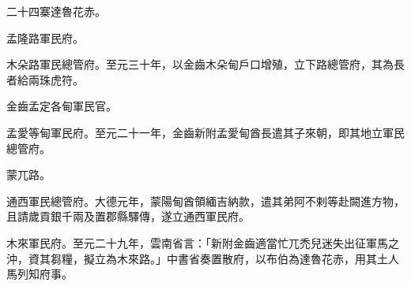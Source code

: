 \begin{pinyinscope}
 二十四寨達魯花赤。



 孟隆路軍民府。



 木朵路軍民總管府。至元三十年，以金齒木朵甸戶口增殖，立下路總管府，其為長者給兩珠虎符。



 金齒孟定各甸軍民官。



 孟愛等甸軍民府。至元二十一年，金齒新附孟愛甸酋長遣其子來朝，即其地立軍民總管府。



 蒙兀路。



 通西軍民總管府。大德元年，蒙陽甸酋領緬吉納款，遣其弟阿不剌等赴闕進方物，且請歲貢銀千兩及置郡縣驛傳，遂立通西軍民府。



 木來軍民府。至元二十九年，雲南省言：「新附金齒適當忙兀禿兒迷失出征軍馬之沖，資其芻糧，擬立為木來路。」中書省奏置散府，以布伯為達魯花赤，用其土人馬列知府事。



\end{pinyinscope}